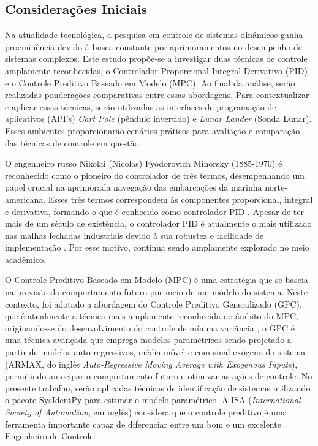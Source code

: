 \documentclass[12pt,           %
a4paper,                       %
openany,                       %
oneside,                       %
chapter=TITLE,                 %
english,                       %
spanish,                       %
brazil,                        %
sumario=tradicional]{abntex2}  %
\begin{document}
\begin{OnehalfSpace}
\section{Considerações Iniciais}
\label{sec:considIniciaisIntroducao}        %
			
Na atualidade tecnológica, a pesquisa em controle de sistemas dinâmicos ganha proeminência devido à busca constante por aprimoramentos no desempenho de sistemas complexos. Este estudo propõe-se a investigar duas técnicas de controle amplamente reconhecidas, o Controlador-Proporcional-Integral-Derivativo (PID) e o Controle Preditivo Baseado em Modelo (MPC). Ao final da análise, serão realizadas ponderações comparativas entre essas abordagens. Para contextualizar e aplicar essas técnicas, serão utilizadas as interfaces de programação de aplicativos (API's) \textit{Cart Pole} (pêndulo invertido) e \textit{Lunar Lander} (Sonda Lunar). Esses ambientes proporcionarão cenários práticos para avaliação e comparação das técnicas de controle em questão.

O engenheiro russo Nikolai (Nicolas) Fyodorovich Minorsky (1885-1970) é reconhecido como o pioneiro do controlador de três termos, desempenhando um papel crucial na aprimorada navegação das embarcações da marinha norte-americana. Esses três termos correspondem às componentes proporcional, integral e derivativa, formando o que é conhecido como controlador PID \citep{1922PID}. Apesar de ter mais de um século de existência, o controlador PID é atualmente o mais utilizado nas malhas fechadas industriais devido à sua robustez e facilidade de implementação \cite{deulkar2020analysis}. Por esse motivo, continua sendo amplamente explorado no meio acadêmico.

O Controle Preditivo Baseado em Modelo (MPC) é uma estratégia que se baseia na previsão do comportamento futuro por meio de um modelo do sistema. Neste contexto, foi adotado a abordagem do Controle Preditivo Generalizado (GPC), que é atualmente a técnica mais amplamente reconhecida no âmbito do MPC, originando-se do desenvolvimento do controle de mínima variância \cite{alba2000control}, o GPC é uma técnica avançada que emprega modelos paramétricos sendo projetado a partir de modelos auto-regressivos, média móvel e com sinal exógeno do sistema (ARMAX, do inglês \textit{Auto-Regressive Moving Average with Exogenous Inputs}), permitindo antecipar o comportamento futuro e otimizar as ações de controle. No presente trabalho, serão aplicadas técnicas de identificação de sistemas utilizando o pacote SysIdentPy \cite{lacerda2020sysidentpy} para estimar o modelo paramétrico. A ISA (\textit{International Society of Automation}, em inglês) considera que o controle preditivo é uma ferramenta importante capaz de diferenciar entre um bom e um excelente Engenheiro de Controle.


\end{OnehalfSpace}
\end{document}
